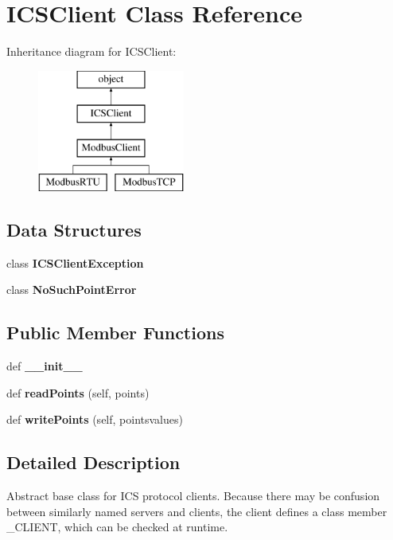 \section{I\+C\+S\+Client Class Reference}
\label{classprotolibs_1_1ics__clients_1_1_i_c_s_client}
Inheritance diagram for I\+C\+S\+Client\+:\begin{figure}[H]
\begin{center}
\leavevmode
\includegraphics[height=4.000000cm]{classprotolibs_1_1ics__clients_1_1_i_c_s_client}
\end{center}
\end{figure}
\subsection*{Data Structures}
\begin{DoxyCompactItemize}
\item 
class {\bf I\+C\+S\+Client\+Exception}
\item 
class {\bf No\+Such\+Point\+Error}
\end{DoxyCompactItemize}
\subsection*{Public Member Functions}
\begin{DoxyCompactItemize}
\item 
def {\bf \+\_\+\+\_\+init\+\_\+\+\_\+}
\item 
def {\bf read\+Points} (self, points)
\item 
def {\bf write\+Points} (self, pointsvalues)
\end{DoxyCompactItemize}


\subsection{Detailed Description}
\begin{DoxyVerb}Abstract base class for ICS protocol clients.
Because there may be confusion between similarly named servers and
clients, the client defines a class member _CLIENT, which
can be checked at runtime.\end{DoxyVerb}
 

